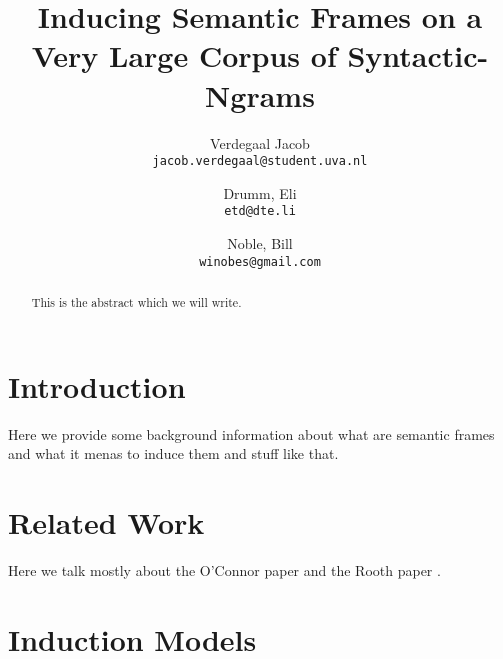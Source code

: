 \documentclass[10pt,twocolumn]{scrartcl}
\author{
    Verdegaal Jacob \\
    \texttt{jacob.verdegaal@student.uva.nl}
    \and
    Drumm, Eli\\
    \texttt{etd@dte.li}
    \and
    Noble, Bill\\
    \texttt{winobes@gmail.com}
}
\title{Inducing Semantic Frames on a Very Large Corpus of Syntactic-Ngrams}
\begin{document}
\maketitle

\begin{abstract}
This is the abstract which we will write.
\end{abstract}



\section{Introduction}
Here we provide some background information about what are semantic frames and 
what it menas to induce them and stuff like that.


\section{Related Work}
Here we talk mostly about the O'Connor paper \cite{oconnor2013} and the Rooth 
paper \cite{rooth1999}.


\section{Induction Models}
\end{document}
